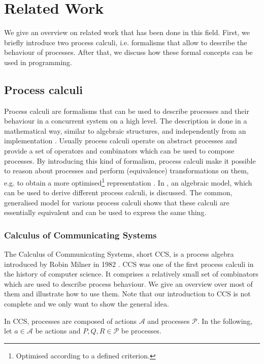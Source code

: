 \chapter{Related Work}
We give an overview on related work that has been done in this field. First, we briefly introduce two process calculi, i.e. formalisms that allow to describe the behaviour of processes. After that, we discuss how these formal concepts can be used in programming.

\section{Process calculi}
Process calculi are formalisms that can be used to describe processes and their behaviour in a concurrent system on a high level. The description is done in a mathematical way, similar to algebraic structures, and independently from an implementation \cite{}. Usually process calculi operate on abstract processes and provide a set of operators and combinators which can be used to compose processes. By introducing this kind of formalism, process calculi make it possible to reason about processes and perform (equivalence) transformations on them, e.g. to obtain a more optimised\footnote{Optimised according to a defined criterion.} representation \cite{}. In \cite{Hoare:2012:LPU:2368298.2368301}, an algebraic model, which can be used to derive different process calculi, is discussed. The common, generalised model for various process calculi shows that these calculi are essentially equivalent and can be used to express the same thing.

\subsection{Calculus of Communicating Systems}
The Calculus of Communicating Systems, short \textsc{CCS}, is a process algebra introduced by Robin Milner in 1982 \cite{Milner:1982:CCS:539036}. \textsc{CCS} was one of the first process calculi in the history of computer science. It comprises a relatively small set of combinators which are used to describe process behaviour. We give an overview over most of them and illustrate how to use them. Note that our introduction to \textsc{CCS} is not complete and we only want to show the general idea.

In \textsc{CCS}, processes are composed of actions $\mathcal{A}$ and processes $\mathcal{P}$. In the following, let $a \in \mathcal{A}$ be actions and $P, Q, R \in \mathcal{P}$ be processes.


